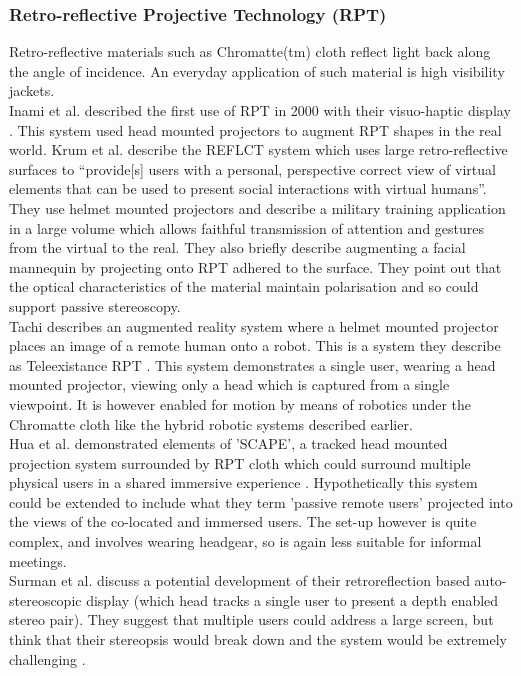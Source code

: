             \subsubsection{Retro-reflective Projective Technology (RPT)}
Retro-reflective materials such as Chromatte(tm) cloth reflect light back along the angle of incidence. An everyday application of such material is high visibility jackets.\\
Inami et al. described the first use of RPT in 2000 with their visuo-haptic display \cite{inami2000visuo}. This system used head mounted projectors to augment RPT shapes in the real world. Krum et al. describe the REFLCT system \cite{Krum2012} which uses large retro-reflective surfaces to ``provide[s] users with a personal, perspective correct view of virtual elements that can be used to present social interactions with virtual humans''. They use helmet mounted projectors and describe a military training application in a large volume which allows faithful transmission of attention and gestures from the virtual to the real. They also briefly describe augmenting a facial mannequin by projecting onto RPT adhered to the surface. They point out that the optical characteristics of the material maintain polarisation and so could support passive stereoscopy.\\
Tachi describes an augmented reality system where a helmet mounted projector  places an image of a remote human onto a robot. This is a system they describe as Teleexistance RPT \cite{Tachi2003, Tachi2004}. This system demonstrates a single user, wearing a head mounted projector, viewing only a head which is captured from a single viewpoint. It is however enabled for motion by means of robotics under the Chromatte cloth like the hybrid robotic systems described earlier.\\
Hua et al. demonstrated elements of 'SCAPE', a tracked head mounted projection system surrounded by RPT cloth which could surround multiple physical users in a shared immersive experience \cite{Hua2004}. Hypothetically this system could be extended to include what they term 'passive remote users' projected into the views of the co-located and immersed users. The set-up however is quite complex, and involves wearing headgear, so is again less suitable for informal meetings.\\
Surman et al. discuss a potential development of their retroreflection based auto-stereoscopic display (which head tracks a single user to present a depth enabled stereo pair). They suggest that multiple users could address a large screen, but think that their stereopsis would break down and the system would be extremely challenging \cite{JSID:JSID295}.\\
